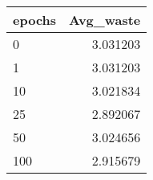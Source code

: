 \begin{tabular}{lr}
\toprule
epochs &  Avg\_waste \\
\midrule
     0 &   3.031203 \\
     1 &   3.031203 \\
    10 &   3.021834 \\
    25 &   2.892067 \\
    50 &   3.024656 \\
   100 &   2.915679 \\
\bottomrule
\end{tabular}
